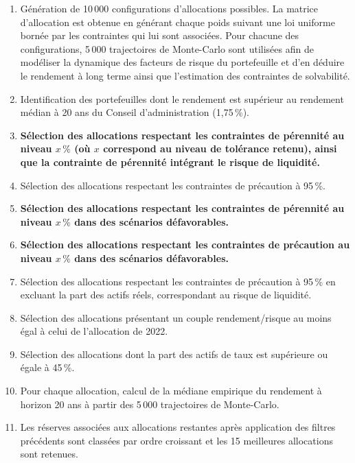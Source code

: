 \documentclass[11pt,a4paper]{article}
\begin{document}
\begin{enumerate}
    \item Génération de 10\,000 configurations d'allocations possibles. La matrice d'allocation est obtenue en générant chaque poids suivant une loi uniforme bornée par les contraintes qui lui sont associées. Pour chacune des configurations, 5\,000 trajectoires de Monte-Carlo sont utilisées afin de modéliser la dynamique des facteurs de risque du portefeuille et d'en déduire le rendement à long terme ainsi que l'estimation des contraintes de solvabilité.

    \item Identification des portefeuilles dont le rendement est supérieur au rendement médian à 20 ans du Conseil d'administration (1,75\,\%).

    \item \textbf{Sélection des allocations respectant les contraintes de pérennité au niveau $x\,\%$ (où $x$ correspond au niveau de tolérance retenu), ainsi que la contrainte de pérennité intégrant le risque de liquidité.}

    \item Sélection des allocations respectant les contraintes de précaution à 95\,\%.

    \item \textbf{Sélection des allocations respectant les contraintes de pérennité au niveau $x\,\%$ dans des scénarios défavorables.}

    \item \textbf{Sélection des allocations respectant les contraintes de précaution au niveau $x\,\%$ dans des scénarios défavorables.}

    \item Sélection des allocations respectant les contraintes de précaution à 95\,\% en excluant la part des actifs réels, correspondant au risque de liquidité.

    \item Sélection des allocations présentant un couple rendement/risque au moins égal à celui de l'allocation de 2022.

    \item Sélection des allocations dont la part des actifs de taux est supérieure ou égale à 45\,\%.

    \item Pour chaque allocation, calcul de la médiane empirique du rendement à horizon 20 ans à partir des 5\,000 trajectoires de Monte-Carlo.

    \item Les réserves associées aux allocations restantes après application des filtres précédents sont classées par ordre croissant et les 15 meilleures allocations sont retenues.
\end{enumerate}
\end{document}
